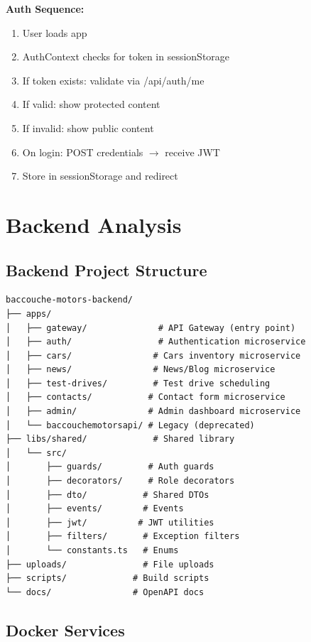 \documentclass[12pt,a4paper]{article}
\begin{document}
\bigskip
\noindent\textbf{Auth Sequence:}
\begin{enumerate}
    \item User loads app
    \item AuthContext checks for token in sessionStorage
    \item If token exists: validate via /api/auth/me
    \item If valid: show protected content
    \item If invalid: show public content
    \item On login: POST credentials $\rightarrow$ receive JWT
    \item Store in sessionStorage and redirect
\end{enumerate}

\newpage

\section{Backend Analysis}
\label{sec:backend}

\subsection{Backend Project Structure}

\begin{verbatim}
baccouche-motors-backend/
├── apps/
│   ├── gateway/              # API Gateway (entry point)
│   ├── auth/                 # Authentication microservice
│   ├── cars/                # Cars inventory microservice
│   ├── news/                # News/Blog microservice
│   ├── test-drives/         # Test drive scheduling
│   ├── contacts/           # Contact form microservice
│   ├── admin/              # Admin dashboard microservice
│   └── baccouchemotorsapi/ # Legacy (deprecated)
├── libs/shared/             # Shared library
│   └── src/
│       ├── guards/         # Auth guards
│       ├── decorators/     # Role decorators
│       ├── dto/           # Shared DTOs
│       ├── events/        # Events
│       ├── jwt/          # JWT utilities
│       ├── filters/       # Exception filters
│       └── constants.ts   # Enums
├── uploads/               # File uploads
├── scripts/             # Build scripts
└── docs/                # OpenAPI docs
\end{verbatim}

\subsection{Docker Services}
\end{document}
